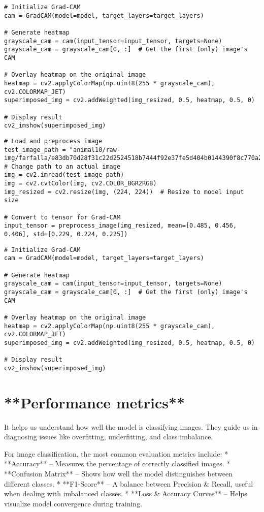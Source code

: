 \begin{verbatim}
# Initialize Grad-CAM
cam = GradCAM(model=model, target_layers=target_layers)

# Generate heatmap
grayscale_cam = cam(input_tensor=input_tensor, targets=None)
grayscale_cam = grayscale_cam[0, :]  # Get the first (only) image's CAM

# Overlay heatmap on the original image
heatmap = cv2.applyColorMap(np.uint8(255 * grayscale_cam), cv2.COLORMAP_JET)
superimposed_img = cv2.addWeighted(img_resized, 0.5, heatmap, 0.5, 0)

# Display result
cv2_imshow(superimposed_img)
\end{verbatim}

\begin{verbatim}
# Load and preprocess image
test_image_path = "animal10/raw-img/farfalla/e83db70d28f31c22d2524518b7444f92e37fe5d404b0144390f8c770a2e9b5_640.jpg"  # Change path to an actual image
img = cv2.imread(test_image_path)
img = cv2.cvtColor(img, cv2.COLOR_BGR2RGB)
img_resized = cv2.resize(img, (224, 224))  # Resize to model input size

# Convert to tensor for Grad-CAM
input_tensor = preprocess_image(img_resized, mean=[0.485, 0.456, 0.406], std=[0.229, 0.224, 0.225])
\end{verbatim}

\begin{verbatim}
# Initialize Grad-CAM
cam = GradCAM(model=model, target_layers=target_layers)

# Generate heatmap
grayscale_cam = cam(input_tensor=input_tensor, targets=None)
grayscale_cam = grayscale_cam[0, :]  # Get the first (only) image's CAM

# Overlay heatmap on the original image
heatmap = cv2.applyColorMap(np.uint8(255 * grayscale_cam), cv2.COLORMAP_JET)
superimposed_img = cv2.addWeighted(img_resized, 0.5, heatmap, 0.5, 0)

# Display result
cv2_imshow(superimposed_img)
\end{verbatim}

\section{**Performance metrics**}

It helps us understand how well the model is classifying images. They guide us in diagnosing issues like overfitting, underfitting, and class imbalance.

For image classification, the most common evaluation metrics include:
*  **Accuracy** – Measures the percentage of correctly classified images.
* **Confusion Matrix** – Shows how well the model distinguishes between different classes.
* **F1-Score** – A balance between Precision & Recall, useful when dealing with imbalanced classes.
* **Loss & Accuracy Curves** – Helps visualize model convergence during training.

